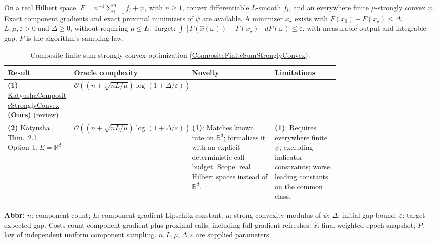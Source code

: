 \begin{table}[tp]
\centering
\caption{Composite finite-sum strongly convex optimization (\href{https://github.com/k3nfalt/longtails/blob/main/LongTails/Setups/CompositeFiniteSumStronglyConvex.lean}{CompositeFiniteSumStronglyConvex}).}\label{tab:CompositeFiniteSumStronglyConvex}
\parbox{\linewidth}{\footnotesize On a real Hilbert space, $F=n^{-1}\sum_{i=1}^{n}f_i+\psi$, with $n\ge1$, convex differentiable $L$-smooth $f_i$, and an everywhere finite $\mu$-strongly convex $\psi$. Exact component gradients and exact proximal minimizers of $\psi$ are available. A minimizer $x_\star$ exists with $F(x_0)-F(x_\star)\le\Delta$; $L,\mu,\varepsilon>0$ and $\Delta\ge0$, without requiring $\mu\le L$. Target: $\int [F(\widehat x(\omega))-F(x_\star)]\,dP(\omega)\le\varepsilon$, with measurable output and integrable gap; $P$ is the algorithm's sampling law.}\par\smallskip
\begin{threeparttable}
\footnotesize
\setlength{\tabcolsep}{4pt}\renewcommand{\arraystretch}{1.25}
\begin{tabularx}{\linewidth}{@{}>{\raggedright\arraybackslash}p{0.20\linewidth}>{\raggedright\arraybackslash}p{0.32\linewidth}>{\raggedright\arraybackslash}p{0.25\linewidth}>{\raggedright\arraybackslash}X@{}}
\toprule
\textbf{Result} & \textbf{Oracle complexity} & \textbf{Novelty} & \textbf{Limitations} \\
\midrule
\textbf{(1)} \href{https://github.com/k3nfalt/longtails/blob/main/LongTails/Theorems/KatyushaCompositeStronglyConvex.lean}{Katyusha\allowbreak Composite\allowbreak Strongly\allowbreak Convex} \textbf{(Ours)} \href{https://github.com/k3nfalt/longtails/blob/main/scripts/reviews/KatyushaCompositeStronglyConvex.md}{(review)}
& $\mathcal{O}\!\left((n+\sqrt{nL/\mu})\log(1+\Delta/\varepsilon)\right)$ & & \\
\midrule[1.2pt]
\textbf{(2)} Katyusha \citep{AllenZhu2018KatyushaComposite}, Thm.~2.1, Option~I; $E=\mathbb{R}^d$
& $\mathcal{O}\!\left((n+\sqrt{nL/\mu})\log(1+\Delta/\varepsilon)\right)$
& \textbf{(1)}: Matches known rate on $\mathbb{R}^d$; formalizes it with an explicit deterministic call budget. Scope: real Hilbert spaces instead of $\mathbb{R}^d$.
& \textbf{(1)}: Requires everywhere finite $\psi$, excluding indicator constraints; worse leading constants on the common class. \\
\bottomrule
\end{tabularx}
\begin{tablenotes}[flushleft]\footnotesize
\item[] \textbf{Abbr:} $n$: component count; $L$: component gradient Lipschitz constant; $\mu$: strong-convexity modulus of $\psi$; $\Delta$: initial-gap bound; $\varepsilon$: target expected gap. Costs count component-gradient plus proximal calls, including full-gradient refreshes. $\widehat x$: final weighted epoch snapshot; $P$: law of independent uniform component sampling. $n,L,\mu,\Delta,\varepsilon$ are supplied parameters.
\end{tablenotes}
\end{threeparttable}
\end{table}
\clearpage
